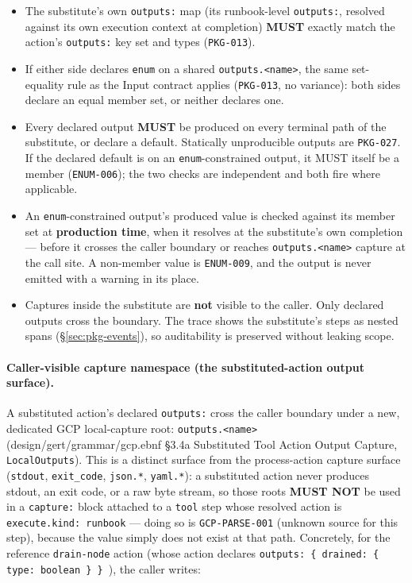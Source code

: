 \begin{itemize}
  \item The substitute's own \texttt{outputs:} map (its runbook-level
        \texttt{outputs:}, resolved against its own execution context at
        completion) \textbf{MUST} exactly match the action's \texttt{outputs:}
        key set and types (\texttt{PKG-013}).
  \item If either side declares \texttt{enum} on a shared
        \texttt{outputs.<name>}, the same set-equality rule as the Input
        contract applies (\texttt{PKG-013}, no variance): both sides
        declare an equal member set, or neither declares one.
  \item Every declared output \textbf{MUST} be produced on every terminal
        path of the substitute, or declare a default. Statically
        unproducible outputs are \texttt{PKG-027}. If the declared default
        is on an \texttt{enum}-constrained output, it MUST itself be a
        member (\texttt{ENUM-006}); the two checks are independent and both
        fire where applicable.
  \item An \texttt{enum}-constrained output's produced value is checked
        against its member set at \textbf{production time}, when it
        resolves at the substitute's own completion --- before it crosses
        the caller boundary or reaches \texttt{outputs.<name>} capture at
        the call site. A non-member value is \texttt{ENUM-009}, and the
        output is never emitted with a warning in its place.
  \item Captures inside the substitute are \textbf{not} visible to the
        caller. Only declared outputs cross the boundary. The trace shows
        the substitute's steps as nested spans (\S\ref{sec:pkg-events}),
        so auditability is preserved without leaking scope.
\end{itemize}

\paragraph{Caller-visible capture namespace (the substituted-action output
surface).} A substituted action's declared \texttt{outputs:} cross the
caller boundary under a new, dedicated GCP local-capture root:
\texttt{outputs.<name>} (design/gert/grammar/gcp.ebnf \S3.4a Substituted
Tool Action Output Capture, \texttt{LocalOutputs}). This is a distinct
surface from the
process-action capture surface (\texttt{stdout}, \texttt{exit\_code},
\texttt{json.*}, \texttt{yaml.*}): a substituted action never produces
stdout, an exit code, or a raw byte stream, so those roots \textbf{MUST NOT}
be used in a \texttt{capture:} block attached to a \texttt{tool} step whose
resolved action is \texttt{execute.kind: runbook} --- doing so is
\texttt{GCP-PARSE-001} (unknown source for this step), because the value
simply does not exist at that path. Concretely, for the reference
\texttt{drain-node} action (whose action declares
\texttt{outputs: \{ drained: \{ type: boolean \} \} }), the caller writes:


